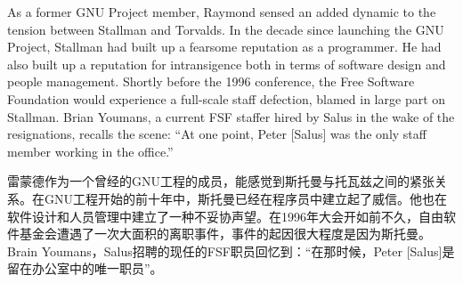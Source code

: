 \ifdefined\eng
As a former GNU Project member, Raymond sensed an added dynamic to the tension between Stallman and Torvalds. In the decade since launching the GNU Project, Stallman had built up a fearsome reputation as a programmer. He had also built up a reputation for intransigence both in terms of software design and people management. Shortly before the 1996 conference, the Free Software Foundation would experience a full-scale staff defection, blamed in large part on Stallman. Brian Youmans, a current FSF staffer hired by Salus in the wake of the resignations, recalls the scene: ``At one point, Peter [Salus] was the only staff member working in the office.''
\fi

\ifdefined\chs
雷蒙德作为一个曾经的GNU工程的成员，能感觉到斯托曼与托瓦兹之间的紧张关系。在GNU工程开始的前十年中，斯托曼已经在程序员中建立起了威信。他也在软件设计和人员管理中建立了一种不妥协声望。在1996年大会开如前不久，自由软件基金会遭遇了一次大面积的离职事件，事件的起因很大程度是因为斯托曼。Brain Youmans，Salus招聘的现任的FSF职员回忆到：``在那时候，Peter [Salus]是留在办公室中的唯一职员''。
\fi








